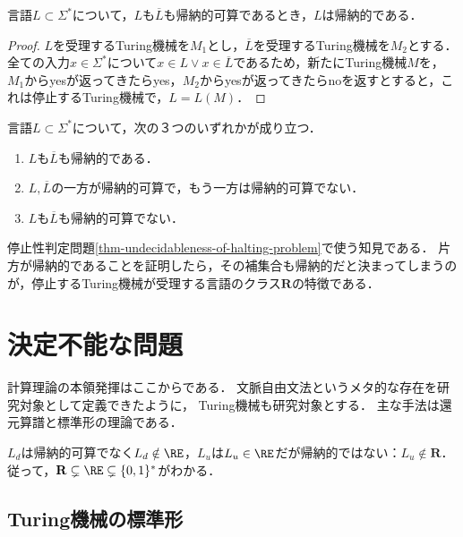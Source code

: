 \begin{proposition}
    言語$L\subset\Sigma^*$について，$L$も$\overline{L}$も帰納的可算であるとき，$L$は帰納的である．
\end{proposition}
\begin{proof}
    $L$を受理するTuring機械を$M_1$とし，$\overline{L}$を受理するTuring機械を$M_2$とする．
    全ての入力$x\in\Sigma^*$について$x\in L\lor x\in\overline{L}$であるため，新たにTuring機械$M$を，
    $M_1$からyesが返ってきたらyes，$M_2$からyesが返ってきたらnoを返すとすると，これは停止するTuring機械で，$L=L(M)$．
\end{proof}

\begin{theorem}\label{thm-language-classification}
    言語$L\subset\Sigma^*$について，次の３つのいずれかが成り立つ．
    \begin{enumerate}
        \item $L$も$\overline{L}$も帰納的である．
        \item $L,\overline{L}$の一方が帰納的可算で，もう一方は帰納的可算でない．
        \item $L$も$\overline{L}$も帰納的可算でない．
    \end{enumerate}
\end{theorem}
\begin{remarks}
    停止性判定問題\ref{thm-undecidableness-of-halting-problem}で使う知見である．
    片方が帰納的であることを証明したら，その補集合も帰納的だと決まってしまうのが，停止するTuring機械が受理する言語のクラス$\mathbf{R}$の特徴である．
\end{remarks}

\section{決定不能な問題}\label{sec-undecidable-problems}

\begin{tcolorbox}[colframe=ForestGreen, colback=ForestGreen!10!white, breakable]
    計算理論の本領発揮はここからである．
    文脈自由文法というメタ的な存在を研究対象として定義できたように，
    Turing機械も研究対象とする．
    主な手法は還元算譜と標準形の理論である．

    $L_d$は帰納的可算でなく$L_d\notin\RE$，$L_u$は$L_u\in\RE$だが帰納的ではない：$L_u\notin\mathbf{R}$．
    従って，$\mathbf{R}\subsetneq\RE\subsetneq\{0,1\}^*$がわかる．
\end{tcolorbox}

\subsection{Turing機械の標準形}

